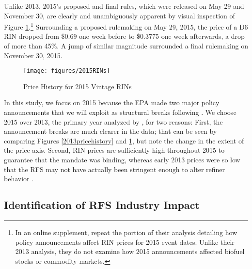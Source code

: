 \documentclass[11pt]{article}
\begin{document}

Unlike 2013, 2015's proposed and final rules, which were released on May 29 and November 30, are clearly and unambiguously apparent by visual inspection of Figure \ref{2015pricehistory}.\footnote{In an online supplement, \cite{Lade2018a} repeat the portion of their analysis detailing how policy announcements affect RIN prices for 2015 event dates. Unlike their 2013 analysis, they do not examine how 2015 announcements affected biofuel stocks or commodity markets.} Surrounding a proposed rulemaking on May 29, 2015, the price of a D6 RIN dropped from \$0.69 one week before to \$0.3775 one week afterwards, a drop of more than 45\%. A jump of similar magnitude surrounded a final rulemaking on November 30, 2015. 

\begin{figure}[h]
	\caption{Price History for 2015 Vintage RINs}
	\label{2015pricehistory}
	\texttt{[image: figures/2015RINs]}
\end{figure}

In this study, we focus on 2015 because the EPA made two major policy announcements that we will exploit as structural breaks following \cite{Lade2018a}. We choose 2015 over 2013, the primary year analyzed by \cite{Lade2018a}, for two reasons: First, the announcement breaks are much clearer in the data; that can be seen by comparing Figures \ref{2013pricehistory} and \ref{2015pricehistory}, but note the change in the extent of the price axis. Second, RIN prices are sufficiently high throughout 2015 to guarantee that the mandate was binding, whereas early 2013 prices were so low that the RFS may not have actually been stringent enough to alter refiner behavior \citep{Whistance2016}.

\subsection{Identification of RFS Industry Impact}
\end{document}
